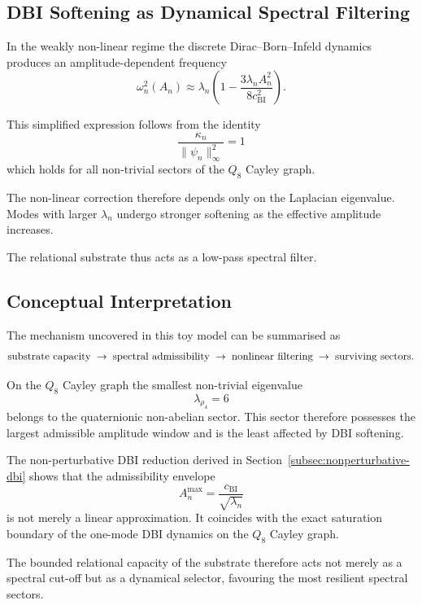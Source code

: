 \documentclass[11pt,a4paper]{article}
\begin{document}
  \subsection{DBI Softening as Dynamical Spectral Filtering}

    In the weakly non-linear regime the discrete Dirac--Born--Infeld dynamics
    produces an amplitude-dependent frequency
    \[
      \omega_n^2(A_n)
      \approx
      \lambda_n
      \left(
        1 -
        \frac{3\lambda_n A_n^2}{8c_{\mathrm{BI}}^2}
      \right).
    \]

    This simplified expression follows from the identity
    \[
      \frac{\kappa_n}{\|\psi_n\|_\infty^2}=1
    \]
    which holds for all non-trivial sectors of the $Q_8$ Cayley graph.

    The non-linear correction therefore depends only on the Laplacian
    eigenvalue.
    Modes with larger $\lambda_n$ undergo stronger softening as the
    effective amplitude increases.

    The relational substrate thus acts as a low-pass spectral
    filter.

  \subsection{Conceptual Interpretation}

    The mechanism uncovered in this toy model can be summarised as
    \[
      \text{sub\-strate capacity}
      \;\rightarrow\;
      \text{spectral admissibility}
      \;\rightarrow\;
      \text{nonlinear filtering}
      \;\rightarrow\;
      \text{surviving sectors}.
    \]

    On the $Q_8$ Cayley graph the smallest non-trivial eigenvalue
    \[
      \lambda_{\rho_4}=6
    \]
    belongs to the quaternionic non-abelian sector.
    This sector therefore possesses the largest admissible amplitude window
    and is the least affected by DBI softening.

    The non-perturbative DBI reduction derived in
    Section~\ref{subsec:nonperturbative-dbi} shows that the admissibility
    envelope
    \[
      A_n^{\max} = \frac{c_{\mathrm{BI}}}{\sqrt{\lambda_n}}
    \]
    is not merely a linear approximation.
    It coincides with the exact saturation boundary of the one-mode
    DBI dynamics on the $Q_8$ Cayley graph.

    The bounded relational capacity of the substrate therefore acts
    not merely as a spectral cut-off but as a dynamical selector,
    favouring the most resilient spectral sectors.
\end{document}

